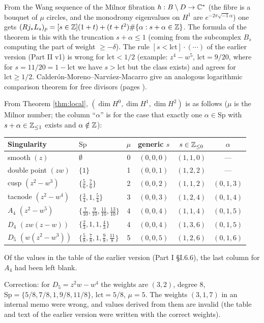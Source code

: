 \begin{rem}[Interpretation \tC \tK]
From the Wang sequence of the Milnor fibration $h:B\setminus D\to\mathbb C^*$ (the fibre is a bouquet of $\mu$ circles, and the monodromy eigenvalues on $H^1$ are $e^{-2\pi\sqrt{-1}\alpha}$) one gets $(Rj_*L_s)_p=[s\in\mathbb Z](1+t)+(t+t^2)\#\{\alpha:s+\alpha\in\mathbb Z\}$. The formula of the theorem is this with the truncation $s+\alpha\le1$ (coming from the subcomplex $B_s$ computing the part of weight $\ge-\delta$). The rule $[s<\mathrm{lct}]\cdot(\cdots)$ of the earlier version (Part II v1) is wrong for $\mathrm{lct}<1/2$ (example: $z^4-w^5$, $\mathrm{lct}=9/20$, where for $s=11/20=1-\mathrm{lct}$ we have $s>\mathrm{lct}$ but the class exists) and agrees for $\mathrm{lct}\ge1/2$. Calder\'on-Moreno--Narv\'aez-Macarro \cite{CMNM} give an analogous logarithmic comparison theorem for free divisors (pages \tQ).
\end{rem}
\begin{obs}\label{obs:localtable}
From Theorem \ref{thm:local}, $(\dim H^0,\dim H^1,\dim H^2)$ is as follows ($\mu$ is the Milnor number; the column ``$\alpha$'' is for the case that exactly one $\alpha\in\mathrm{Sp}$ with $s+\alpha\in\mathbb Z_{\le1}$ exists and $\alpha\notin\mathbb Z$):
\begin{center}\small
\begin{tabular}{llcccc}\toprule
Singularity & $\mathrm{Sp}$ & $\mu$ & generic $s$ & $s\in\mathbb Z_{\le0}$ & $\alpha$\\\midrule
smooth $(z)$ & $\emptyset$ & 0 & $(0,0,0)$ & $(1,1,0)$ & ---\\
double point $(zw)$ & $\{1\}$ & 1 & $(0,0,1)$ & $(1,2,2)$ & ---\\
cusp $(z^2-w^3)$ & $\{\frac56,\frac76\}$ & 2 & $(0,0,2)$ & $(1,1,2)$ & $(0,1,3)$\\
tacnode $(z^2-w^4)$ & $\{\frac34,1,\frac54\}$ & 3 & $(0,0,3)$ & $(1,2,4)$ & $(0,1,4)$\\
$A_4$ $(z^2-w^5)$ & $\{\frac7{10},\frac9{10},\frac{11}{10},\frac{13}{10}\}$ & 4 & $(0,0,4)$ & $(1,1,4)$ & $(0,1,5)$\\
$D_4$ $(zw(z-w))$ & $\{\frac23,1,1,\frac43\}$ & 4 & $(0,0,4)$ & $(1,3,6)$ & $(0,1,5)$\\
$D_5$ $(w(z^2-w^3))$ & $\{\frac58,\frac78,1,\frac98,\frac{11}8\}$ & 5 & $(0,0,5)$ & $(1,2,6)$ & $(0,1,6)$\\\bottomrule
\end{tabular}
\end{center}
Of the values in the table of the earlier version (Part I \S I.6.6), the last column for $A_4$ had been left blank.
\end{obs}
\noindent \tP Correction: for $D_5=z^2w-w^4$ the weights are $(3,2)$, degree 8, $\mathrm{Sp}=\{5/8,7/8,1,9/8,11/8\}$, $\mathrm{lct}=5/8$, $\mu=5$. The weights $(3,1,7)$ in an internal memo were wrong, and values derived from them are invalid (the table and text of the earlier version were written with the correct weights).


